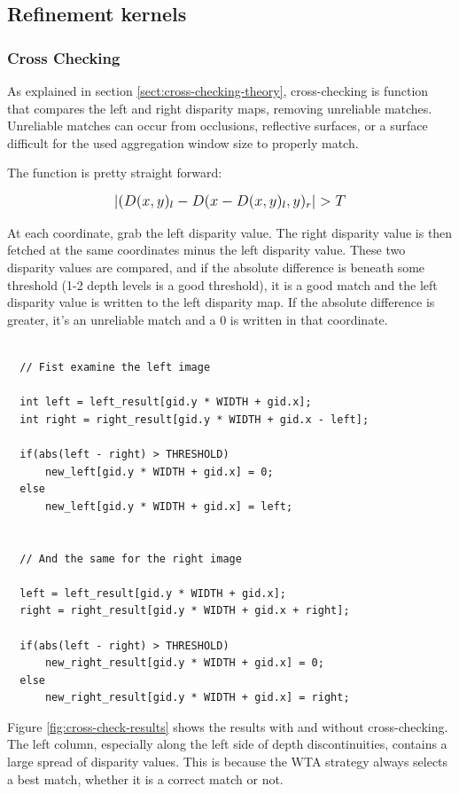 \subsection{Refinement kernels}


\subsubsection{Cross Checking}

As explained in section \ref{sect:cross-checking-theory},
cross-checking is function that compares the left and right disparity
maps, removing unreliable matches. Unreliable matches can occur from
occlusions, reflective surfaces, or a surface difficult for the used
aggregation window size to properly match.


The function is pretty straight forward:

\[ \mathlarger{| (D(x,y)_l - D(x - D(x,y)_l ,y)_r | > T} \]

At each coordinate, grab the left disparity value. The right disparity
value is then fetched at the same coordinates minus the left disparity
value. These two disparity values are compared, and if the absolute
difference is beneath some threshold (1-2 depth levels is a good
threshold), it is a good match and the left disparity value is written
to the left disparity map. If the absolute difference is greater, it's
an unreliable match and a 0 is written in that coordinate.

\begin{lstlisting}[label={lst:cross-check}, caption=Cross-checking
  function.]

  // Fist examine the left image

  int left = left_result[gid.y * WIDTH + gid.x];
  int right = right_result[gid.y * WIDTH + gid.x - left];

  if(abs(left - right) > THRESHOLD)
      new_left[gid.y * WIDTH + gid.x] = 0;
  else
      new_left[gid.y * WIDTH + gid.x] = left;


  // And the same for the right image

  left = left_result[gid.y * WIDTH + gid.x];
  right = right_result[gid.y * WIDTH + gid.x + right];

  if(abs(left - right) > THRESHOLD)
      new_right_result[gid.y * WIDTH + gid.x] = 0;
  else
      new_right_result[gid.y * WIDTH + gid.x] = right;

\end{lstlisting}

Figure \ref{fig:cross-check-results} shows the results with and
without cross-checking. The left column, especially along the left
side of depth discontinuities, contains a large spread of disparity
values. This is because the WTA strategy always selects a best match,
whether it is a correct match or not.

